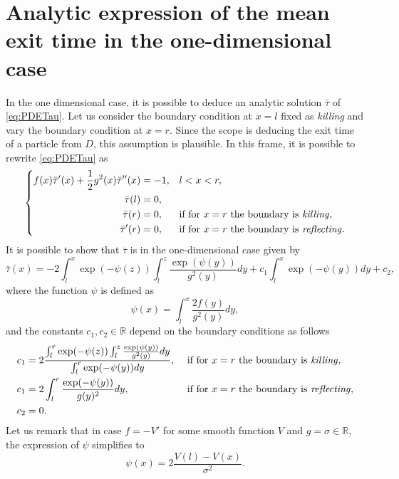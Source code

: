 \section{Analytic expression of the mean exit time in the one-dimensional case} \label{sec:Appendix1}
In the one dimensional case, it is possible to deduce an analytic solution $\bar\tau$ of \eqref{eq:PDETau}. Let us consider the boundary condition at $x=l$ fixed as \textit{killing} and vary the boundary condition at $x=r$. Since the scope is deducing the exit time of a particle from $D$, this assumption is plausible. In this frame, it is possible to rewrite \eqref{eq:PDETau} as
\begin{equation}\label{eq:ODETau}
\left \{
\begin{aligned}
	f(x)\bar\tau'(x) + \frac{1}{2} g^2(x) \bar\tau''(x) &= -1, && l < x < r, \\
	\bar\tau(l) &= 0, \\
	\bar\tau(r) &= 0, && \text{if for $x = r$ the boundary is \textit{killing}}, \\
	\bar\tau'(r) &= 0, && \text{if for $x = r$ the boundary is \textit{reflecting}}. 
\end{aligned} \right .
\end{equation}
It is possible to show \cite{Krumscheid2015,Pavliotis2014} that $\bar\tau$ is in the one-dimensional case given by
\begin{equation}\label{eq:AnalyticTau}
	\bar\tau(x) = -2 \int_l^x \exp(-\psi(z)) \int_l^z \frac{\exp(\psi(y))}{g^2(y)}dy + c_1 \int_l^x \exp(-\psi(y))dy + c_2,
\end{equation}
where the function $\psi$ is defined as
\begin{equation}\label{eq:psi}
	\psi(x) = \int_l^x \frac{2f(y)}{g^2(y)}dy,
\end{equation}
and the constants $c_1,c_2 \in \mathbb{R}$ depend on the boundary conditions as follows
\begin{equation}\label{eq:Constants}
\begin{aligned}
	c_1 &= 2\frac{\int_l^r \exp(-\psi(z)) \int_l^z \frac{\exp(\psi(y))}{g^2(y)}dy}{\int_l^r \exp(-\psi(y))dy}, && \text{  if for $x = r$ the boundary is \textit{killing}}, \\
	c_1 &= 2\int_l^r \frac{\exp(-\psi(y))}{g(y)^2}dy, && \text{  if for $x = r$ the boundary is \textit{reflecting}}, \\
	c_2 &= 0.
\end{aligned}
\end{equation}
Let us remark that in case $f = -V'$ for some smooth function $V$ and $g = \sigma \in \mathbb{R}$, the expression of $\psi$ simplifies to
\begin{equation}\label{eq:psiSemplified}
	\psi(x) = 2\frac{V(l)-V(x)}{\sigma^2}.
\end{equation}

